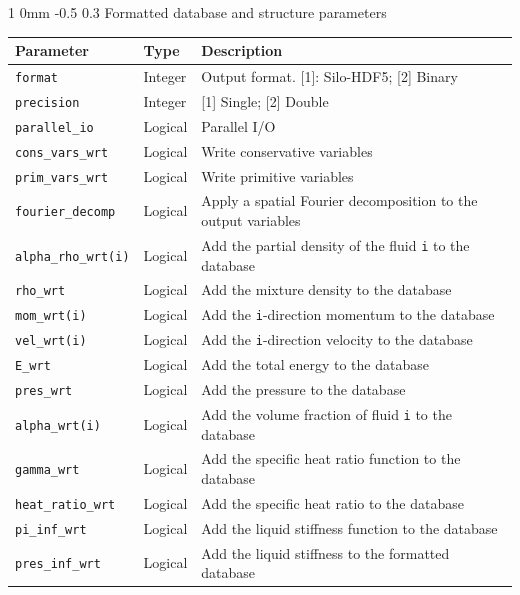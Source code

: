 \documentclass[11pt]{article}
\makeatletter
\renewcommand{\subsubsection}{\@startsection
{subsubsection}%
{1}%
{0mm}%
{-0.5\baselineskip}%
{0.3\baselineskip}%
{\normalfont\normalsize\bfseries\color{myBrown}}}%
\newcommand\tablefont{\footnotesize}
\makeatother
\begin{document}
\subsubsection{Formatted database and structure parameters}\label{s:fdop}
\begin{table}[H]
{\tablefont
\begin{tabularx}{6.5in}{ | R{1.5in} C{1in} Q{3.5in} | }
\hline
\textbf{Parameter} & \textbf{Type} & \textbf{Description} \\ \hline
    \texttt{format} &			Integer & 	Output format. [1]: Silo-HDF5; [2] Binary	\\
    \texttt{precision} &			Integer &	[1] Single; [2] Double	 \\
    \texttt{parallel\_io} &		Logical &	Parallel I/O	\\
    \texttt{cons\_vars\_wrt} &	Logical &	Write conservative variables \\	
    \texttt{prim\_vars\_wrt} &	Logical &	Write primitive variables	\\
    \texttt{fourier\_decomp} &	Logical &	Apply a spatial Fourier decomposition to the output variables	\\
    \texttt{alpha\_rho\_wrt(i)} &	Logical &	Add the partial density of the fluid \texttt{i} to the database \\	
    \texttt{rho\_wrt} &			Logical &	Add the mixture density to the database	 \\
    \texttt{mom\_wrt(i)} &		Logical &	Add the \texttt{i}-direction momentum to the database	 \\
    \texttt{vel\_wrt(i)} &		Logical &	Add the \texttt{i}-direction velocity to the database	  \\
    \texttt{E\_wrt} &			Logical &	Add the total energy to the database	 \\
    \texttt{pres\_wrt} &			Logical &	Add the pressure to the database	\\
    \texttt{alpha\_wrt(i)} &		Logical &	Add the volume fraction of fluid \texttt{i} to the database	\\
    \texttt{gamma\_wrt} &		Logical &	Add the specific heat ratio function to the database	\\
    \texttt{heat\_ratio\_wrt} &	Logical &	Add the specific heat ratio to the database	\\
    \texttt{pi\_inf\_wrt} &		Logical &	Add the liquid stiffness function to the database \\	
    \texttt{pres\_inf\_wrt} &		Logical &	Add the liquid stiffness to the formatted database	 \\

\end{tabularx}}
\end{table}
\end{document}
